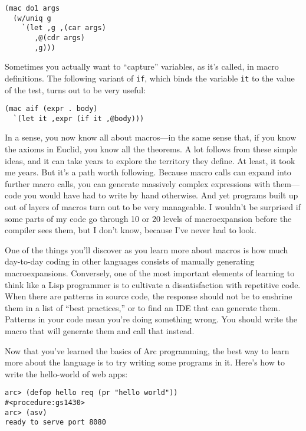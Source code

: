 \documentclass[a4paper,12pt]{book}
\begin{document}
\begin{verbatim}
(mac do1 args
  (w/uniq g
    `(let ,g ,(car args)
       ,@(cdr args)
       ,g)))
\end{verbatim}

Sometimes you actually want to ``capture'' variables, as it's called,
in macro definitions.  The following variant of \verb|if|, which binds the
variable {\tt{}it} to the value of the test, turns out to be very useful:

\begin{verbatim}
(mac aif (expr . body)
  `(let it ,expr (if it ,@body)))
\end{verbatim}

In a sense, you now know all about macros---in the same sense that,
if you know the axioms in Euclid, you know all the theorems.  A lot
follows from these simple ideas, and it can take years to explore
the territory they define.  At least, it took me years.  But it's
a path worth following.  Because macro calls can expand into further
macro calls, you can generate massively complex expressions with
them---code you would have had to write by hand otherwise.  And yet
programs built up out of layers of macros turn out to be very
manageable.  I wouldn't be surprised if some parts of my code go
through 10 or 20 levels of macroexpansion before the compiler sees
them, but I don't know, because I've never had to look.

One of the things you'll discover as you learn more about macros
is how much day-to-day coding in other languages consists of manually
generating macroexpansions.  Conversely, one of the most important
elements of learning to think like a {\sc{}Lisp} programmer is to cultivate
a dissatisfaction with repetitive code.  When there are patterns
in source code, the response should not be to enshrine them in a
list of ``best practices,'' or to find an IDE that can generate them.
Patterns in your code mean you're doing something wrong.  You should
write the macro that will generate them and call that instead.

Now that you've learned the basics of {\sc{}Arc} programming, the best way
to learn more about the language is to try writing some programs
in it.  Here's how to write the hello-world of web apps:

\begin{verbatim}
arc> (defop hello req (pr "hello world"))
#<procedure:gs1430>
arc> (asv)
ready to serve port 8080
\end{verbatim}
\end{document}
